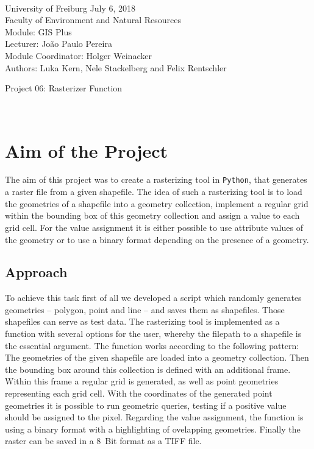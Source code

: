 \documentclass[10pt, a4paper]{article}
\begin{document}
	
	\markboth{}
	\\\noindent University of Freiburg \hspace{10cm}  July 6, 2018
	\\Faculty of Environment and Natural Resources
	\\Module: GIS Plus
	\\Lecturer: João Paulo Pereira
	\\Module Coordinator: Holger Weinacker
	\\Authors: Luka Kern, Nele Stackelberg and Felix Rentschler
	\\
	
	\begin{center}
		\huge{Project 06: Rasterizer Function} \vspace{0.5cm}\\
	\end{center}
	
	\
	\onehalfspacing %
	
	
	\section{Aim of the Project}
	The aim of this project was to create a rasterizing tool in \texttt{Python}, that generates a raster file from a given shapefile. The idea of such a rasterizing tool is to load the geometries of a shapefile into a geometry collection, implement a regular grid within the bounding box of this geometry collection and assign a value to each grid cell. For the value assignment it is either possible to use attribute values of the geometry or to use a binary format depending on the presence of a geometry.
	
	\subsection*{Approach}\label{doc}
	To achieve this task first of all we developed a script which randomly generates geometries -- polygon, point and line -- and saves them as shapefiles. Those shapefiles can serve as test data. The rasterizing tool is implemented as a function with several options for the user, whereby the filepath to a shapefile is the essential argument. The function works according to the following pattern: The geometries of the given shapefile are loaded into a geometry collection. Then the bounding box around this collection is defined with an additional frame. Within this frame a regular grid is generated, as well as point geometries representing each grid cell. With the coordinates of the generated point geometries it is possible to run geometric queries, testing if a positive value should be assigned to the pixel. Regarding the value assignment, the function is using a binary format with a highlighting of ovelapping geometries. Finally the raster can be saved in a \SI{8}{Bit} format as a TIFF file.
	
\end{document}
